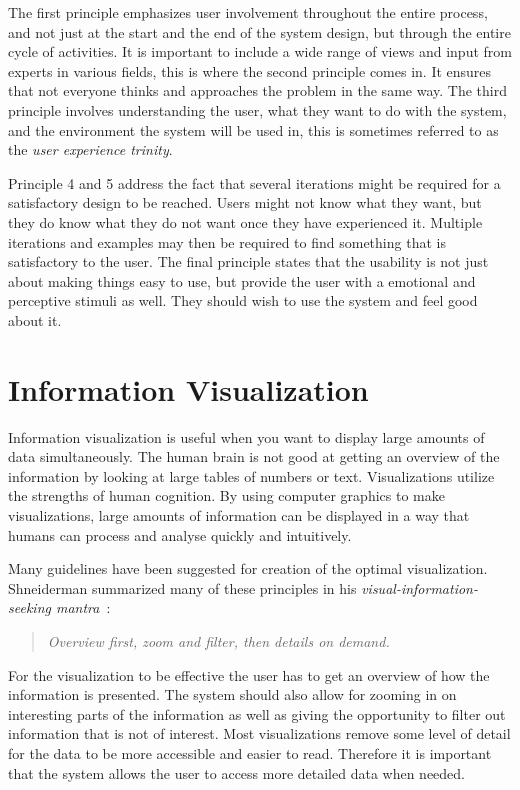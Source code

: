 The first principle emphasizes user involvement throughout the entire process, and not just at the start and the end of the system design, but through the entire cycle of activities. It is important to include a wide range of views and input from experts in various fields, this is where the second principle comes in. It ensures that not everyone thinks and approaches the problem in the same way. The third principle involves understanding the user, what they want to do with the system, and the environment the system will be used in, this is sometimes referred to as the \textit{user experience trinity}. 

Principle 4 and 5 address the fact that several iterations might be required for a satisfactory design to be reached. Users might not know what they want, but they do know what they do not want once they have experienced it. Multiple iterations and examples may then be required to find something that is satisfactory to the user. The final principle states that the usability is not just about making things easy to use, but provide the user with a emotional and perceptive stimuli as well. They should wish to use the system and feel good about it.

\section{Information Visualization}
Information visualization is useful when you want to display large amounts of data simultaneously. The human brain is not good at getting an overview of the information by looking at large tables of numbers or text. Visualizations utilize the strengths of human cognition. By using computer graphics to make visualizations, large amounts of information can be displayed in a way that humans can process and analyse quickly and intuitively.

Many guidelines have been suggested for creation of the optimal visualization. Shneiderman summarized many of these principles in his \emph{visual-information-seeking mantra}~\cite{shneiderman}:

\vspace{-13pt}
\begin{quote}
\textit{Overview first, zoom and filter, then details on demand.}
\end{quote}

For the visualization to be effective the user has to get an overview of how the information is presented. The system should also allow for zooming in on interesting parts of the information as well as giving the opportunity to filter out information that is not of interest. Most visualizations remove some level of detail for the data to be more accessible and easier to read. Therefore it is important that the system allows the user to access more detailed data when needed.

